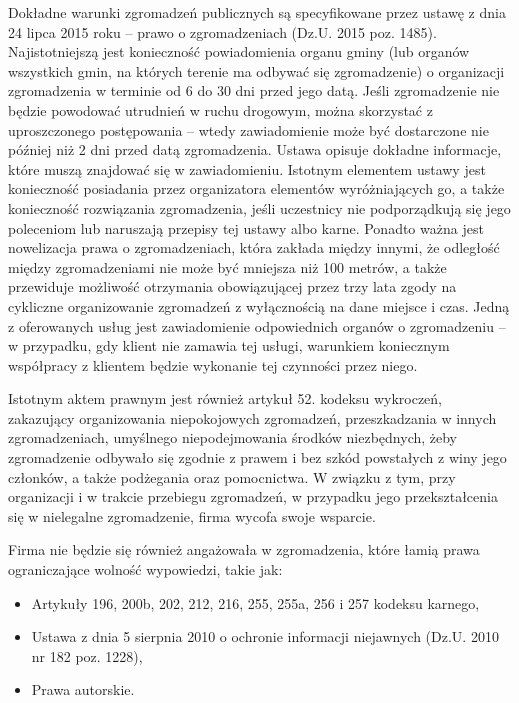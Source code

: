 \documentclass{article}
\begin{document}
Dokładne warunki zgromadzeń publicznych są specyfikowane przez ustawę z dnia 24 lipca 2015 roku -- prawo o zgromadzeniach (Dz.U. 2015 poz. 1485). Najistotniejszą jest konieczność powiadomienia organu gminy (lub organów wszystkich gmin, na których terenie ma odbywać się zgromadzenie) o organizacji zgromadzenia w terminie od 6 do 30 dni przed jego datą. Jeśli zgromadzenie nie będzie powodować utrudnień w ruchu drogowym, można skorzystać z uproszczonego postępowania -- wtedy zawiadomienie może być dostarczone nie później niż 2 dni przed datą zgromadzenia. Ustawa opisuje dokładne informacje, które muszą znajdować się w zawiadomieniu. Istotnym elementem ustawy jest konieczność posiadania przez organizatora elementów wyróżniających go, a także konieczność rozwiązania zgromadzenia, jeśli uczestnicy nie podporządkują się jego poleceniom lub naruszają przepisy tej ustawy albo karne. Ponadto ważna jest nowelizacja prawa o zgromadzeniach, która zakłada między innymi, że odległość między zgromadzeniami nie może być mniejsza niż 100 metrów, a także przewiduje możliwość otrzymania obowiązującej przez trzy lata zgody na cykliczne organizowanie zgromadzeń z wyłącznością na dane miejsce i czas. 
Jedną z oferowanych usług jest zawiadomienie odpowiednich organów o zgromadzeniu -- w przypadku, gdy klient nie zamawia tej usługi, warunkiem koniecznym współpracy z klientem będzie wykonanie tej czynności przez niego.


Istotnym aktem prawnym jest również artykuł 52. kodeksu wykroczeń, zakazujący organizowania niepokojowych zgromadzeń, przeszkadzania w innych zgromadzeniach, umyślnego niepodejmowania środków niezbędnych, żeby zgromadzenie odbywało się zgodnie z prawem i bez szkód powstałych z winy jego członków, a także podżegania oraz pomocnictwa. W związku z tym, przy organizacji i w trakcie przebiegu zgromadzeń, w przypadku jego przekształcenia się w nielegalne zgromadzenie, firma wycofa swoje wsparcie. 

Firma nie będzie się również angażowała w zgromadzenia, które łamią prawa ograniczające wolność wypowiedzi, takie jak:
\begin{itemize}
\item Artykuły 196, 200b, 202, 212, 216, 255, 255a, 256 i 257 kodeksu karnego, 
\item Ustawa z dnia 5 sierpnia 2010 o ochronie informacji niejawnych (Dz.U. 2010 nr 182 poz. 1228),
\item Prawa autorskie.
\end{itemize}
\end{document}
